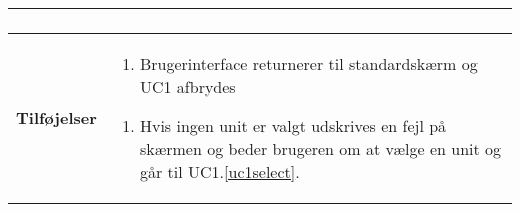 \begin{table}[H]
\begin{tabular} {|p{6cm}|p{8cm}|}
\begin{enumerate}
			\end{enumerate}\\\hline
		
		\textbf{Tilføjelser}					
		&\begin{enumerate}[label= \ref{uc1ex1}a.]
			\item Brugerinterface returnerer til standardskærm og UC1 afbrydes
		\end{enumerate}
											
		\begin{enumerate}[label= \ref{uc1ex2}a.]
			\item Hvis ingen unit er valgt udskrives en fejl på skærmen og beder brugeren om at vælge en unit og går til UC1.\ref{uc1select}.
		\end{enumerate} \\\hline
											

	\end{tabular}
	\label{UC1} 
\end{table}